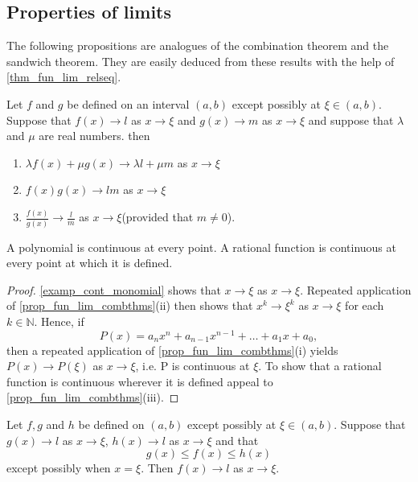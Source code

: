 \documentclass[10pt, a4paper]{article}
\newcommand{\N}{\mathbb{N}}
\begin{document}
\subsection{Properties of limits}
The following propositions are analogues of the combination theorem and the sandwich theorem. They are easily deduced from these results with the help of \autoref{thm_fun_lim_relseq}.
\begin{proposition}\label{prop_fun_lim_combthms}
    Let $f$ and $g$ be defined on an interval $(a, b)$ except possibly at $\xi \in (a, b)$. Suppose that $f(x) \rightarrow l$ as $x \rightarrow \xi$ and $g(x) \rightarrow m$ as $x \rightarrow \xi$ and suppose that $\lambda$ and $\mu$ are real numbers. then
    \begin{enumerate}[label = (\roman*)]
        \item $\lambda f(x) + \mu g(x) \rightarrow \lambda l + \mu m$ as $x \rightarrow \xi$
        \item $f(x)g(x) \rightarrow lm$ as $x \rightarrow \xi$
        \item $\frac{f(x)}{g(x)} \rightarrow \frac{l}{m}$ as $x \rightarrow \xi$\quad(provided that $m \neq 0$).
    \end{enumerate}
\end{proposition}

\begin{theorem}
    A polynomial is continuous at every point. A rational function is continuous at every point at which it is defined.
    \begin{proof}
        \autoref{examp_cont_monomial} shows that $x \rightarrow \xi$ as $x \rightarrow \xi$. Repeated application of \autoref{prop_fun_lim_combthms}(ii) then shows that $x ^ k \rightarrow \xi ^ k$ as $x \rightarrow \xi$ for each $k \in \N$. Hence, if
        $$P(x) = a_n x ^ n + a_{n - 1} x ^ {n - 1} + \dotsc + a_1 x + a_0,$$
        then a repeated application of \autoref{prop_fun_lim_combthms}(i) yields $P(x) \rightarrow P(\xi)$ as $x \rightarrow \xi$, i.e. P is continuous at $\xi$. To show that a rational function is continuous wherever it is defined appeal to \autoref{prop_fun_lim_combthms}(iii).
    \end{proof}
\end{theorem}

\begin{proposition}
    Let $f, g$ and $h$ be defined on $(a, b)$ except possibly at $\xi \in (a, b)$. Suppose that $g(x) \rightarrow l$ as $x \rightarrow \xi$, $h(x) \rightarrow l$ as $x \rightarrow \xi$ and that
    $$g(x) \leq f(x) \leq h(x)$$
    except possibly when $x = \xi$. Then $f(x) \rightarrow l$ as $x \rightarrow \xi$.
\end{proposition}
\end{document}
